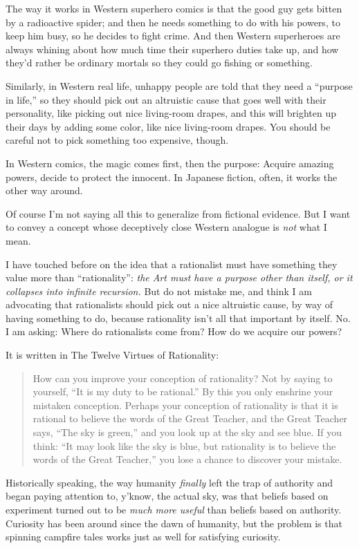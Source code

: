 {
 The way it works in Western superhero comics is that the good guy
gets bitten by a radioactive spider; and then he needs something to do
with his powers, to keep him busy, so he decides to fight crime. And
then Western superheroes are always whining about how much time their
superhero duties take up, and how they'd rather be
ordinary mortals so they could go fishing or something.}

{
 Similarly, in Western real life, unhappy people are told that they
need a ``purpose in life,'' so they
should pick out an altruistic cause that goes well with their
personality, like picking out nice living-room drapes, and this will
brighten up their days by adding some color, like nice living-room
drapes. You should be careful not to pick something too expensive,
though.}

{
 In Western comics, the magic comes first, then the purpose:
Acquire amazing powers, decide to protect the innocent. In Japanese
fiction, often, it works the other way around.}

{
 Of course I'm not saying all this to generalize
from fictional evidence. But I want to convey a concept whose
deceptively close Western analogue is \textit{not} what I mean.}

{
 I have touched before on the idea that a rationalist must have
something they value more than
``rationality'': \textit{the Art
must have a purpose other than itself, or it collapses into infinite
recursion.} But do not mistake me, and think I am advocating that
rationalists should pick out a nice altruistic cause, by way of having
something to do, because rationality isn't all that
important by itself. No. I am asking: Where do rationalists come from?
How do we acquire our powers?}

{
 It is written in The Twelve Virtues of Rationality:}

\begin{quote}
{
 How can you improve your conception of rationality? Not by saying
to yourself, ``It is my duty to be
rational.'' By this you only enshrine your mistaken
conception. Perhaps your conception of rationality is that it is
rational to believe the words of the Great Teacher, and the Great
Teacher says, ``The sky is green,''
and you look up at the sky and see blue. If you think:
``It may look like the sky is blue, but rationality is
to believe the words of the Great Teacher,'' you lose
a chance to discover your mistake.}
\end{quote}

{
 Historically speaking, the way humanity \textit{finally} left the
trap of authority and began paying attention to,
y'know, the actual sky, was that beliefs based on
experiment turned out to be \textit{much more useful} than beliefs
based on authority. Curiosity has been around since the dawn of
humanity, but the problem is that spinning campfire tales works just as
well for satisfying curiosity.}

